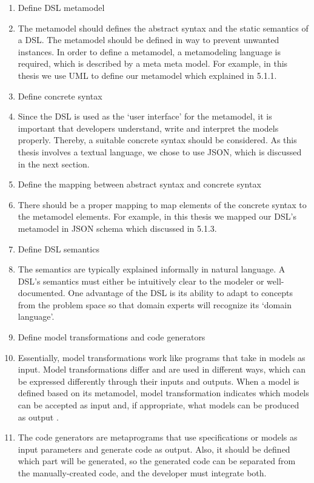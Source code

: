 \begin{enumerate}
\item Define DSL metamodel
    \item[] The metamodel should defines the abstract syntax and the static semantics of a DSL. The metamodel should be defined in way to prevent unwanted instances. In order to define a metamodel, a metamodeling language is required, which is described by a meta meta model. For example, in this thesis we use UML to define our metamodel which explained in 5.1.1.

\item Define concrete syntax
    \item[] Since the DSL is used as the ‘user interface’ for the metamodel, it is important that developers understand, write and interpret the models properly. Thereby, a suitable concrete syntax should be considered. As this thesis involves a textual language, we chose to use JSON, which is discussed in the next section.
\item Define the mapping between abstract syntax and concrete syntax
    \item[] There should be a proper mapping to map elements of the concrete syntax to the metamodel elements. For example, in this thesis we mapped our DSL's metamodel in JSON schema which discussed in 5.1.3.

\item Define DSL semantics
    \item[] The semantics are typically explained informally in natural language. A DSL's semantics must either be intuitively clear to the modeler or well-documented. One advantage of the DSL is its ability to adapt to concepts from the problem space so that domain experts will recognize its ‘domain language’.
\item Define model transformations and code generators
    \item[] Essentially, model transformations work like programs that take in models as input. Model transformations differ and are used in different ways, which can be expressed differently through their inputs and outputs. When a model is defined based on its metamodel, model transformation indicates which models can be accepted as input and, if appropriate, what models can be produced as output \cite{model_transformation}.
    \item[] The code generators are metaprograms that use specifications or models as input parameters and generate code as output.  Also, it should be defined which part will be generated, so the generated code can be separated from the manually-created code, and the developer must integrate both.

\end{enumerate}

